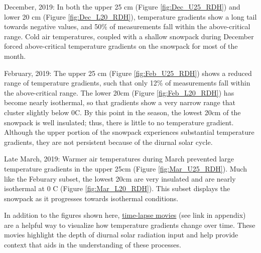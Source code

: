December, 2019: In both the upper 25 cm (Figure \ref{fig:Dec_U25_RDH}) and lower 20 cm (Figure \ref{fig:Dec_L20_RDH}), temperature gradients show a long tail towards negative values, and 50\% of measurements fall within the above-critical range. Cold air temperatures, coupled with a shallow snowpack during December forced above-critical temperature gradients on the snowpack for most of the month. 

February, 2019: The upper 25 cm (Figure \ref{fig:Feb_U25_RDH}) shows a reduced range of temperature gradients, such that only 12\% of measurements fall within the above-critical range. The lower 20cm (Figure \ref{fig:Feb_L20_RDH}) has become nearly isothermal, so that gradients show a very narrow range that cluster slightly below 0\textdegree C. By this point in the season, the lowest 20cm of the snowpack is well insulated; thus, there is little to no temperature gradient. Although the upper portion of the snowpack experiences substantial temperature gradients, they are not persistent because of the diurnal solar cycle. 

Late March, 2019: Warmer air temperatures during March prevented large temperature gradients in the upper 25cm (Figure \ref{fig:Mar_U25_RDH}). Much like the Feburary subset, the lowest 20cm are very insulated and are nearly isothermal at 0 \textdegree C (Figure \ref{fig:Mar_L20_RDH}). This subset displays the snowpack as it progresses towards isothermal conditions. 

In addition to the figures shown here, \href{https://www.youtube.com/playlist?list=PLN7P9tpWCRZofzf19t5gqyeo645Kbmsac}{time-lapse movies} (see link in appendix) are a helpful way to visualize how temperature gradients change over time. These movies highlight the depth of diurnal solar radiation input and help provide context that aids in the understanding of these processes.

